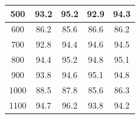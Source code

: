 \begin{table}[H]
{\begin{tabular}{ccccc}
            \hline
            500                                                                   & 93.2                                                            & 95.2                                                                & 92.9                                                               & 94.3                                                           \\
            \hline
            600                                                                   & 86.2                                                            & 85.6                                                                & 86.6                                                               & 86.2                                                           \\
            \hline
            700                                                                   & 92.8                                                            & 94.4                                                                & 94.6                                                               & 94.5                                                           \\
            \hline
            800                                                                   & 94.4                                                            & 95.2                                                                & 94.8                                                               & 95.1                                                           \\
            \hline
            900                                                                   & 93.8                                                            & 94.6                                                                & 95.1                                                               & 94.8                                                           \\
            \hline
            1000                                                                  & 88.5                                                            & 87.8                                                                & 85.6                                                               & 86.3                                                           \\
            \hline
            1100                                                                  & 94.7                                                            & 96.2                                                                & 93.8                                                               & 94.2                                                           \\

\end{tabular}}
\end{table}
